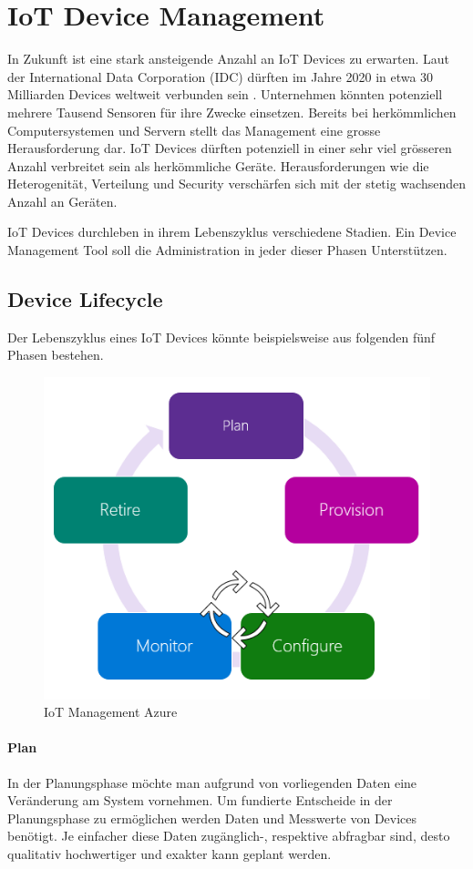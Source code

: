 \chapter{IoT Device Management}
In Zukunft ist eine stark ansteigende Anzahl an IoT Devices zu erwarten. Laut der International Data Corporation (IDC) dürften im Jahre 2020 in etwa 30 Milliarden Devices weltweit verbunden sein \cite{IDC15}. Unternehmen könnten potenziell mehrere Tausend Sensoren für ihre Zwecke einsetzen. Bereits bei herkömmlichen Computersystemen und Servern stellt das Management eine grosse Herausforderung dar. IoT Devices dürften potenziell in einer sehr viel grösseren Anzahl verbreitet sein als herkömmliche Geräte. Herausforderungen wie die Heterogenität, Verteilung und Security verschärfen sich mit der stetig wachsenden Anzahl an Geräten. 

IoT Devices durchleben in ihrem Lebenszyklus verschiedene Stadien. Ein Device Management Tool soll die Administration in jeder dieser Phasen Unterstützen.
\section{Device Lifecycle}
Der Lebenszyklus eines IoT Devices könnte beispielsweise aus folgenden fünf Phasen bestehen.
\begin{figure}[H]
\centering
\includegraphics[scale=0.5]{images/hubdevmgmt-azure.png}
\caption{IoT Management Azure \cite{IoTMgmtAzure}}
\end{figure}
\subsubsection{Plan}
In der Planungsphase möchte man aufgrund von vorliegenden Daten eine Veränderung am System vornehmen. Um fundierte Entscheide in der Planungsphase zu ermöglichen werden Daten und Messwerte von Devices benötigt. Je einfacher diese Daten zugänglich-, respektive abfragbar sind, desto qualitativ hochwertiger und exakter kann geplant werden.
